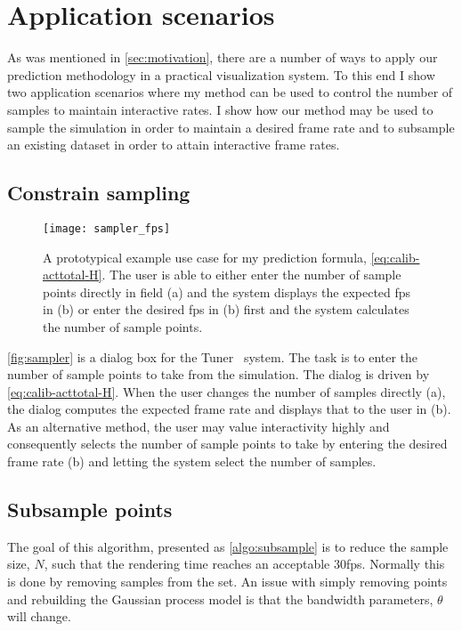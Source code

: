 \section{Application scenarios}
\label{sec:application_scenarios}

As was mentioned in \autoref{sec:motivation}, there are a number of ways to apply
our prediction methodology in a practical visualization system. 
To this end I show two application scenarios where my method can be
used to control the number of samples to maintain interactive 
rates.  I show how our method may be used 
to sample the simulation in order
to maintain a desired frame rate and to subsample an existing dataset in
order to attain interactive frame rates.

\subsection{Constrain sampling}
\label{sec:constrainsampling}

\begin{figure}[h]
\centering
\texttt{[image: sampler\_fps]}
\caption[Using rendering time prediction to constrain sampling]{%
  A prototypical example use case for my prediction formula,
  \autoref{eq:calib-acttotal-H}. The user
  is able to either enter the number of sample points directly in field (a)
  and the system displays the expected fps in (b) or enter the desired fps
  in (b) first and the system calculates the number of sample points.
}
\label{fig:sampler}
\end{figure}


\autoref{fig:sampler} is a dialog box for the Tuner~\cite{Torsney-Weir:2011} system. 
The task is
to enter the number of sample points to take from the simulation. The dialog
is driven by \autoref{eq:calib-acttotal-H}. When the user changes the number of
samples directly (a), the dialog computes the expected frame rate and displays
that to the user in (b). As an alternative method, the user may value
interactivity highly and consequently selects the number of sample points to
take by entering the desired frame rate (b) and letting the system select the
number of samples.

\subsection{Subsample points}
\label{sec:subsamplepoints}

The goal of this algorithm, presented as \autoref{algo:subsample} is to reduce the
sample size, $N$, such that the rendering time reaches an acceptable 30fps.
Normally this is done by removing samples from the set.  An issue with simply
removing points and rebuilding the Gaussian process model is that the
bandwidth parameters, $\theta$ will change.

